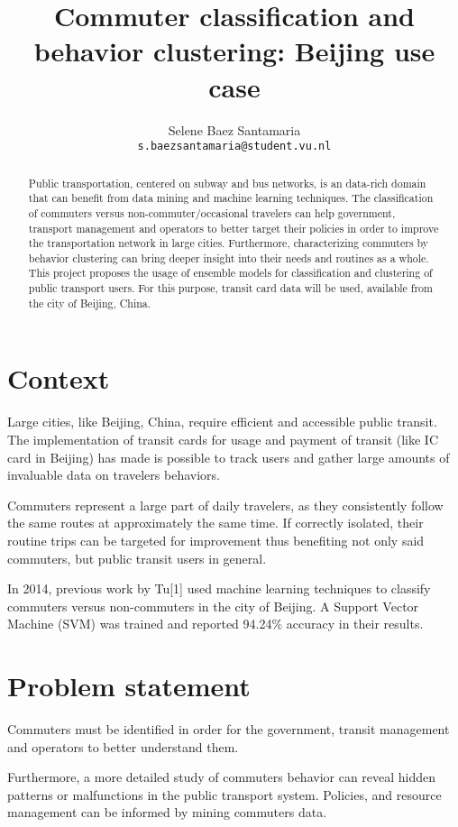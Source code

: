 \documentclass{article}
\title{Commuter classification and behavior clustering: Beijing use case}
\author{
  Selene Baez  Santamaria \\
  \texttt{s.baezsantamaria@student.vu.nl}
}
\begin{document}

\maketitle

\begin{abstract}
  Public transportation, centered on subway and bus networks, is an data-rich domain that can benefit from data mining and machine learning techniques. The classification of commuters versus non-commuter/occasional travelers can help government, transport management and operators to better target their policies in order to improve the transportation network in large cities. Furthermore, characterizing commuters by behavior clustering can bring deeper insight into their needs and routines as a whole. 
  This project proposes the usage of ensemble models for classification and clustering of public transport users. For this purpose, transit card data will be used, available from the city of Beijing, China. 
\end{abstract}

\section{Context}
Large cities, like Beijing, China, require efficient and accessible public transit. The implementation of transit cards for usage and payment of transit (like IC card in Beijing) has made is possible to track users and gather large  amounts of invaluable data on travelers behaviors. 

Commuters represent a large part of daily travelers, as they consistently follow the same routes at approximately the same time. If correctly isolated, their routine trips can be targeted for improvement thus benefiting not only said commuters, but public transit users in general. 

In 2014, previous work by Tu[1] used machine learning techniques to classify commuters versus non-commuters in the city of Beijing. A Support Vector Machine (SVM) was trained and reported 94.24\% accuracy in their results. 

\section{Problem statement}
Commuters must be identified in order for the government, transit management and operators to better understand them. 

Furthermore, a more detailed study of commuters behavior can reveal hidden patterns or malfunctions in the public transport system. Policies, and resource management can be informed by mining commuters data.
\end{document}
